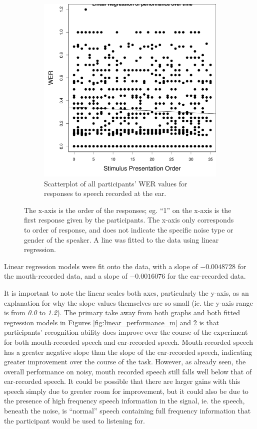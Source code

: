 \documentclass[dissertation,copyright]{uathesis}
\makeatletter
\def\maxwidth{ %
  \ifdim\Gin@nat@width>\linewidth
    \linewidth
  \else
    \Gin@nat@width
  \fi
}
\makeatother
\begin{document}
\begin{figure}[t]
\begin{subfigure}{0.47\textwidth}
\includegraphics[width=\maxwidth]{figure/line_graph_chrono-1} 

\caption{Scatterplot of all participants' WER values for responses to speech recorded at the ear.}
\label{fig:linear_performance_e}
\end{subfigure}
\caption{The x-axis is the order of the responses; eg. ``1'' on the x-axis is the first response given by the participants.  The x-axis only corresponds to order of response, and does not indicate the specific noise type or gender of the speaker.  A line was fitted to the data using linear regression.}
\end{figure}
%
Linear regression models were fit onto the data, with a slope of $-0.0048728$ for the mouth-recorded data, and a slope of $-0.0016076$ for the ear-recorded data.

It is important to note the linear scales both axes, particularly the y-axis, as an explanation for why the slope values themselves are so small (ie. the y-axis range is from \textit{0.0} to \textit{1.2}).  The primary take away from both graphs and both fitted regression models in Figures \ref{fig:linear_performance_m} and \ref{fig:linear_performance_e} is that participants' recognition ability does improve over the course of the experiment for both mouth-recorded speech and ear-recorded speech.  Mouth-recorded speech has a greater negative slope than the slope of the ear-recorded speech, indicating greater improvement over the course of the task.  However, as already seen, the overall performance on noisy, mouth recorded speech still falls well below that of ear-recorded speech. It could be possible that there are larger gains with this speech simply due to greater room for improvement, but it could also be due to the presence of high frequency speech information in the signal, ie. the speech, beneath the noise, is ``normal'' speech containing full frequency information that the participant would be used to listening for.
\end{document}
